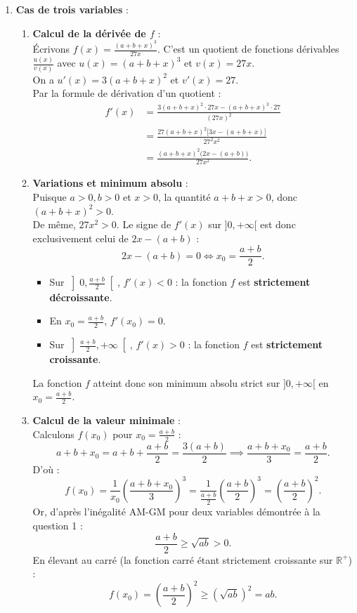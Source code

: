 \documentclass[11pt,a4paper]{article}
\newcommand{\R}{\mathbb{R}}
\begin{document}
\begin{correctionbox}
\begin{enumerate}[label=\textbf{\arabic*.}]
    \item \textbf{Cas de trois variables} :
    \begin{enumerate}[label=\alph*.]
        \item \textbf{Calcul de la dérivée de $f$} :\\
        Écrivons $f(x) = \frac{(a+b+x)^3}{27x}$. C'est un quotient de fonctions dérivables $\frac{u(x)}{v(x)}$ avec $u(x) = (a+b+x)^3$ et $v(x) = 27x$.\\
        On a $u'(x) = 3(a+b+x)^2$ et $v'(x) = 27$.\\
        Par la formule de dérivation d'un quotient :
        \begin{align*}
        f'(x) &= \frac{3(a+b+x)^2 \cdot 27x - (a+b+x)^3 \cdot 27}{(27x)^2} \\
        &= \frac{27(a+b+x)^2 \Big[ 3x - (a+b+x) \Big]}{27^2 x^2} \\
        &= \frac{(a+b+x)^2 \big( 2x - (a+b) \big)}{27 x^2}.
        \end{align*}

        \item \textbf{Variations et minimum absolu} :\\
        Puisque $a > 0, b > 0$ et $x > 0$, la quantité $a+b+x > 0$, donc $(a+b+x)^2 > 0$.\\
        De même, $27x^2 > 0$.
        Le signe de $f'(x)$ sur $]0, +\infty[$ est donc exclusivement celui de $2x - (a+b)$ :
        \[
        2x - (a+b) = 0 \iff x_0 = \frac{a+b}{2}.
        \]
        \begin{itemize}
            \item Sur $\left]0, \frac{a+b}{2}\right[$, $f'(x) < 0$ : la fonction $f$ est \textbf{strictement décroissante}.
            \item En $x_0 = \frac{a+b}{2}$, $f'(x_0) = 0$.
            \item Sur $\left]\frac{a+b}{2}, +\infty\right[$, $f'(x) > 0$ : la fonction $f$ est \textbf{strictement croissante}.
        \end{itemize}
        La fonction $f$ atteint donc son minimum absolu strict sur $]0, +\infty[$ en $x_0 = \frac{a+b}{2}$.

        \item \textbf{Calcul de la valeur minimale} :\\
        Calculons $f(x_0)$ pour $x_0 = \frac{a+b}{2}$ :
        \[
        a+b+x_0 = a+b+\frac{a+b}{2} = \frac{3(a+b)}{2} \implies \frac{a+b+x_0}{3} = \frac{a+b}{2}.
        \]
        D'où :
        \[
        f(x_0) = \frac{1}{x_0} \left( \frac{a+b+x_0}{3} \right)^3 = \frac{1}{\frac{a+b}{2}} \left( \frac{a+b}{2} \right)^3 = \left( \frac{a+b}{2} \right)^2.
        \]
        Or, d'après l'inégalité AM-GM pour deux variables démontrée à la question 1 :
        \[
        \frac{a+b}{2} \ge \sqrt{ab} > 0.
        \]
        En élevant au carré (la fonction carré étant strictement croissante sur $\R^+$) :
        \[
        f(x_0) = \left( \frac{a+b}{2} \right)^2 \ge (\sqrt{ab})^2 = ab.
        \]


\end{enumerate}
\end{enumerate}
\end{correctionbox}
\end{document}
